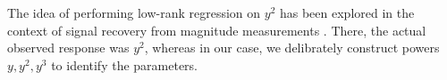 The idea of performing low-rank regression on $y^2$ has been explored
in the context of signal recovery from magnitude measurements
\cite{candes11phaselift,ohlsson12phase}.
There, the actual observed response was $y^2$,
whereas in our case, we delibrately construct powers $y,y^2,y^3$
to identify the parameters.



